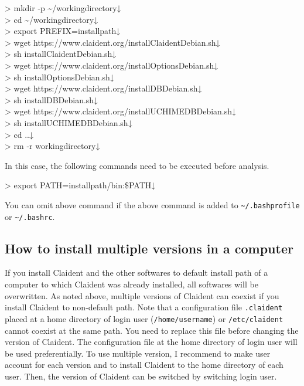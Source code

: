 \documentclass[titlepage,10pt,a4paper,english]{jsbook}
\newenvironment{cmd}{\begin{oframed}\raggedright\ttfamily\footnotesize\setlength{\baselineskip}{1.4em}}{\end{oframed}\vspace{-1em}}
\begin{document}
\begin{cmd}
{\textgreater} mkdir -p {\textasciitilde}/workingdirectory↓\\
{\textgreater} cd {\textasciitilde}/workingdirectory↓\\
{\textgreater} export PREFIX=install{\textunderscore}path↓\\
{\textgreater} wget https://www.claident.org/installClaident{\textunderscore}Debian.sh↓\\
{\textgreater} sh installClaident{\textunderscore}Debian.sh↓\\
{\textgreater} wget https://www.claident.org/installOptions{\textunderscore}Debian.sh↓\\
{\textgreater} sh installOptions{\textunderscore}Debian.sh↓\\
{\textgreater} wget https://www.claident.org/installDB{\textunderscore}Debian.sh↓\\
{\textgreater} sh installDB{\textunderscore}Debian.sh↓\\
{\textgreater} wget https://www.claident.org/installUCHIMEDB{\textunderscore}Debian.sh↓\\
{\textgreater} sh installUCHIMEDB{\textunderscore}Debian.sh↓\\
{\textgreater} cd ..↓\\
{\textgreater} rm -r workingdirectory↓
\end{cmd}

In this case, the following commands need to be executed before analysis.

\begin{cmd}
{\textgreater} export PATH=install{\textunderscore}path/bin:\$PATH↓
\end{cmd}

You can omit above command if the above command is added to \texttt{{\textasciitilde}/.bash{\textunderscore}profile} or \texttt{{\textasciitilde}/.bashrc}.

\subsection{How to install multiple versions in a computer}

If you install Claident and the other softwares to default install path of a computer to which Claident was already installed, all softwares will be overwritten.
As noted above, multiple versions of Claident can coexist if you install Claident to non-default path.
Note that a configuration file \texttt{.claident} placed at a home directory of login user (\texttt{/home/username}) or \texttt{/etc/claident} cannot coexist at the same path.
You need to replace this file before changing the version of Claident.
The configuration file at the home directory of login user will be used preferentially.
To use multiple version, I recommend to make user account for each version and to install Claident to the home directory of each user.
Then, the version of Claident can be switched by switching login user.
\end{document}
